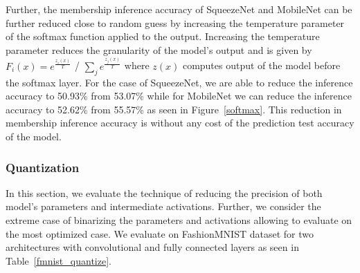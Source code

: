 Further, the membership inference accuracy of SqueezeNet and MobileNet can be further reduced close to random guess by increasing the temperature parameter of the softmax function applied to the output.
Increasing the temperature parameter reduces the granularity of the model's output and is given by $F_i(x) = e^{\frac{z_i(x)}{T}}$ / $ \sum_{j}e^{\frac{z_j(x)}{T}}$ where $z(x)$ computes output of the model before the softmax layer.
For the case of SqueezeNet, we are able to reduce the inference accuracy to 50.93\% from 53.07\% while for MobileNet we can reduce the inference accuracy to 52.62\% from 55.57\% as seen in Figure~\ref{softmax}.
This reduction in membership inference accuracy is without any cost of the prediction test accuracy of the model.




\subsubsection{Quantization}\label{quant}

In this section, we evaluate the technique of reducing the precision of both model's parameters and intermediate activations.
Further, we consider the extreme case of binarizing the parameters and activations allowing to evaluate on the most optimized case.
We evaluate on FashionMNIST dataset for two architectures with convolutional and fully connected layers as seen in Table~\ref{fmnist_quantize}.

